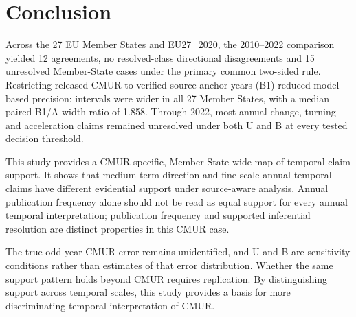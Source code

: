 \section{Conclusion}

Across the 27 EU Member States and EU27\_2020, the 2010--2022 comparison yielded 12 agreements, no resolved-class directional disagreements and 15 unresolved Member-State cases under the primary common two-sided rule. Restricting released CMUR to verified source-anchor years (B1) reduced model-based precision: intervals were wider in all 27 Member States, with a median paired B1/A width ratio of 1.858. Through 2022, most annual-change, turning and acceleration claims remained unresolved under both U and B at every tested decision threshold.

This study provides a CMUR-specific, Member-State-wide map of temporal-claim support. It shows that medium-term direction and fine-scale annual temporal claims have different evidential support under source-aware analysis. Annual publication frequency alone should not be read as equal support for every annual temporal interpretation; publication frequency and supported inferential resolution are distinct properties in this CMUR case.

The true odd-year CMUR error remains unidentified, and U and B are sensitivity conditions rather than estimates of that error distribution. Whether the same support pattern holds beyond CMUR requires replication. By distinguishing support across temporal scales, this study provides a basis for more discriminating temporal interpretation of CMUR.

